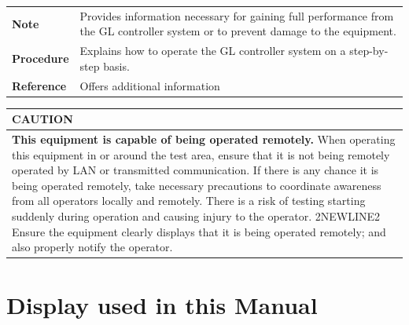 \begin{longtable}[]{@{}ll@{}}
\toprule
\endhead
\begin{minipage}[t]{0.28\columnwidth}\raggedright
\textbf{Note}\strut
\end{minipage} & \begin{minipage}[t]{0.66\columnwidth}\raggedright
Provides information necessary for gaining full performance from the GL
controller system or to prevent damage to the equipment.\strut
\end{minipage}\tabularnewline
\begin{minipage}[t]{0.28\columnwidth}\raggedright
\textbf{Procedure}\strut
\end{minipage} & \begin{minipage}[t]{0.66\columnwidth}\raggedright
Explains how to operate the GL controller system on a step-by-step
basis.\strut
\end{minipage}\tabularnewline
\begin{minipage}[t]{0.28\columnwidth}\raggedright
\textbf{Reference}\strut
\end{minipage} & \begin{minipage}[t]{0.66\columnwidth}\raggedright
Offers additional information\strut
\end{minipage}\tabularnewline
\bottomrule
\end{longtable}

\begin{longtable}[]{@{}l@{}}
\toprule
\begin{minipage}[b]{0.97\columnwidth}\raggedright
CAUTION\strut
\end{minipage}\tabularnewline
\midrule
\endhead
\begin{minipage}[t]{0.97\columnwidth}\raggedright
\textbf{This equipment is capable of being operated remotely.} When
operating this equipment in or around the test area, ensure that it is
not being remotely operated by LAN or transmitted communication. If
there is any chance it is being operated remotely, take necessary
precautions to coordinate awareness from all operators locally and
remotely. There is a risk of testing starting suddenly during operation
and causing injury to the operator. 2NEWLINE2 Ensure the equipment
clearly displays that it is being operated remotely; and also properly
notify the operator.\strut
\end{minipage}\tabularnewline
\bottomrule
\end{longtable}


\section{Display used in this
Manual}

